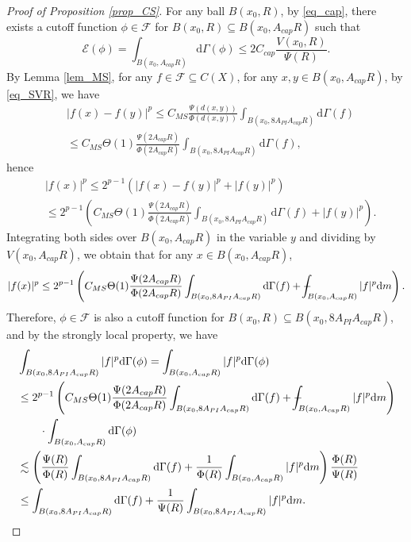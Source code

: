 \documentclass[11pt,a4paper]{article}
\numberwithin{equation}{section}
\def\Xint#1{\mathchoice
{\XXint\displaystyle\textstyle{#1}}%
{\XXint\textstyle\scriptstyle{#1}}%
{\XXint\scriptstyle\scriptscriptstyle{#1}}%
{\XXint\scriptscriptstyle\scriptscriptstyle{#1}}%
\!\int}
\def\XXint#1#2#3{{\setbox0=\hbox{$#1{#2#3}{\int}$ }
\vcenter{\hbox{$#2#3$ }}\kern-.6\wd0}}
\def\dashint{\Xint-}
\theoremstyle{plain}
\theoremstyle{definition}
\begin{document}
\begin{proof}[Proof of Proposition \ref{prop_CS}]
For any ball $B(x_0,R)$, by \ref{eq_cap}, there exists a cutoff function $\phi\in\mathcal{F}$ for $B(x_0,R)\subseteq B(x_0,A_{cap}R)$ such that
$$\mathcal{E}(\phi)=\int_{B(x_0,A_{cap}R)}\mathrm{d}\Gamma(\phi)\le2C_{cap}\frac{V(x_0,R)}{\Psi(R)}.$$
By Lemma \ref{lem_MS}, for any $f\in\mathcal{F}\subseteq C(X)$, for any $x,y\in B(x_0,A_{cap}R)$, by \ref{eq_SVR}, we have
\begin{align*}
&|f(x)-f(y)|^p\le C_{MS}\frac{\Psi(d(x,y))}{\Phi(d(x,y))}\int_{B(x_0,8A_{PI}A_{cap}R)}\mathrm{d}\Gamma(f)\\
&\le C_{MS}\Theta(1)\frac{\Psi(2A_{cap}R)}{\Phi(2A_{cap}R)}\int_{B(x_0,8A_{PI}A_{cap}R)}\mathrm{d}\Gamma(f),
\end{align*}
hence
\begin{align*}
&|f(x)|^p\le2^{p-1}(|f(x)-f(y)|^p+|f(y)|^p)\\
&\le2^{p-1}\left(C_{MS}\Theta(1)\frac{\Psi(2A_{cap}R)}{\Phi(2A_{cap}R)}\int_{B(x_0,8A_{PI}A_{cap}R)}\mathrm{d}\Gamma(f)+|f(y)|^p\right).
\end{align*}
Integrating both sides over $B(x_0,A_{cap}R)$ in the variable $y$ and dividing by $V(x_0,A_{cap}R)$, we obtain that for any $x\in B(x_0,A_{cap}R)$,
$$|f(x)|^p\le 2^{p-1}\left(C_{MS}\Theta(1)\frac{\Psi(2A_{cap}R)}{\Phi(2A_{cap}R)}\int_{B(x_0,8A_{PI}A_{cap}R)}\mathrm{d}\Gamma(f)+\dashint_{B(x_0,A_{cap}R)}|f|^p\mathrm{d} m\right).$$
Therefore, $\phi\in\mathcal{F}$ is also a cutoff function for $B(x_0,R)\subseteq B(x_0,8A_{PI}A_{cap}R)$, and by the strongly local property, we have
\begin{align*}
&\int_{B(x_0,8A_{PI}A_{cap}R)}|f|^p\mathrm{d}\Gamma(\phi)=\int_{B(x_0,A_{cap}R)}|f|^p\mathrm{d}\Gamma(\phi)\\
&\le2^{p-1}\left(C_{MS}\Theta(1)\frac{\Psi(2A_{cap}R)}{\Phi(2A_{cap}R)}\int_{B(x_0,8A_{PI}A_{cap}R)}\mathrm{d}\Gamma(f)+\dashint_{B(x_0,A_{cap}R)}|f|^p\mathrm{d} m\right)\\
&\hspace{20pt}\cdot\int_{B(x_0,A_{cap}R)}\mathrm{d}\Gamma(\phi)\\
&\lesssim \left(\frac{\Psi(R)}{\Phi(R)}\int_{B(x_0,8A_{PI}A_{cap}R)}\mathrm{d}\Gamma(f)+\frac{1}{\Phi(R)}\int_{B(x_0,A_{cap}R)}|f|^p\mathrm{d} m\right)\frac{\Phi(R)}{\Psi(R)}\\
&\le\int_{B(x_0,8A_{PI}A_{cap}R)}\mathrm{d}\Gamma(f)+\frac{1}{\Psi(R)}\int_{B(x_0,8A_{PI}A_{cap}R)}|f|^p\mathrm{d} m.
\end{align*}
\end{proof}
\end{document}

